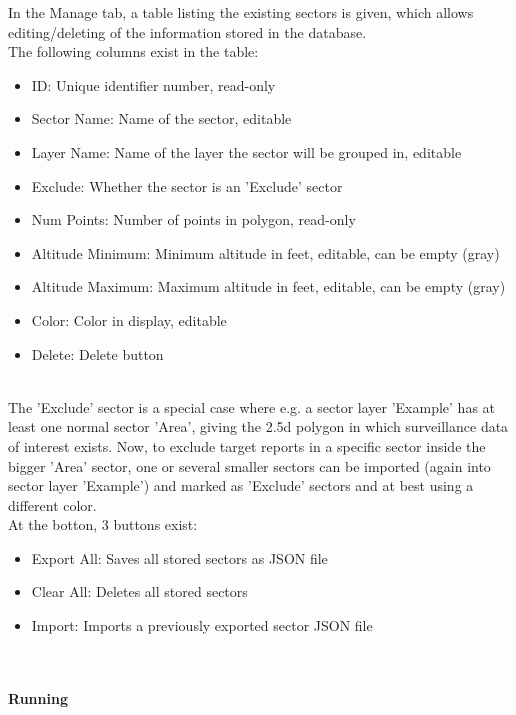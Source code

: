 In the Manage tab, a table listing the existing sectors is given, which allows editing/deleting of the information stored in the database. \\

The following columns exist in the table:
\begin{itemize}  
\item ID: Unique identifier number, read-only
\item Sector Name: Name of the sector, editable
\item Layer Name: Name of the layer the sector will be grouped in, editable
\item Exclude: Whether the sector is an 'Exclude' sector
\item Num Points: Number of points in polygon, read-only
\item Altitude Minimum: Minimum altitude in feet, editable, can be empty (gray)
\item Altitude Maximum: Maximum altitude in feet, editable, can be empty (gray)
\item Color: Color in display, editable
\item Delete: Delete button
\end{itemize}
\ \\

The 'Exclude' sector is a special case where e.g. a sector layer 'Example' has at least one normal sector 'Area', giving the 2.5d polygon in which surveillance data of interest exists. Now, to exclude target reports in a specific sector inside the bigger 'Area' sector, one or several smaller sectors can be imported (again into sector layer 'Example') and marked as 'Exclude' sectors and at best using a different color. \\

At the botton, 3 buttons exist:

\begin{itemize}  
\item Export All: Saves all stored sectors as JSON file
\item Clear All: Deletes all stored sectors
\item Import: Imports a previously exported sector JSON file
\end{itemize}
\ \\

\paragraph {Running}

